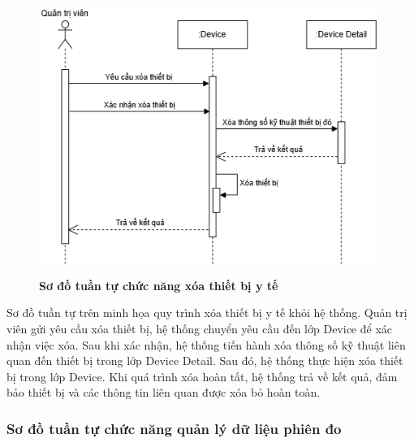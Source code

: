 \begin{figure}[H]
	\centering
	\includegraphics[width=11cm,height=9cm]{Images/sequence/device/delete.drawio.png}
	\caption[Sơ đồ tuần tự chức năng xóa thiết bị y tế]{\bfseries \fontsize{12pt}{0pt}
		\selectfont Sơ đồ tuần tự chức năng xóa thiết bị y tế}
	\label{sequence_delete_device} %
\end{figure}
Sơ đồ tuần tự trên minh họa quy trình xóa thiết bị y tế khỏi hệ thống. Quản trị viên gửi yêu cầu xóa thiết bị, hệ thống chuyển yêu cầu đến lớp Device để xác nhận việc xóa.
Sau khi xác nhận, hệ thống tiến hành xóa thông số kỹ thuật liên quan đến thiết bị trong lớp Device Detail. Sau đó, hệ thống thực hiện xóa thiết bị trong lớp Device.
Khi quá trình xóa hoàn tất, hệ thống trả về kết quả, đảm bảo thiết bị và các thông tin liên quan được xóa bỏ hoàn toàn.

\subsubsection{Sơ đồ tuần tự chức năng quản lý dữ liệu phiên đo}

